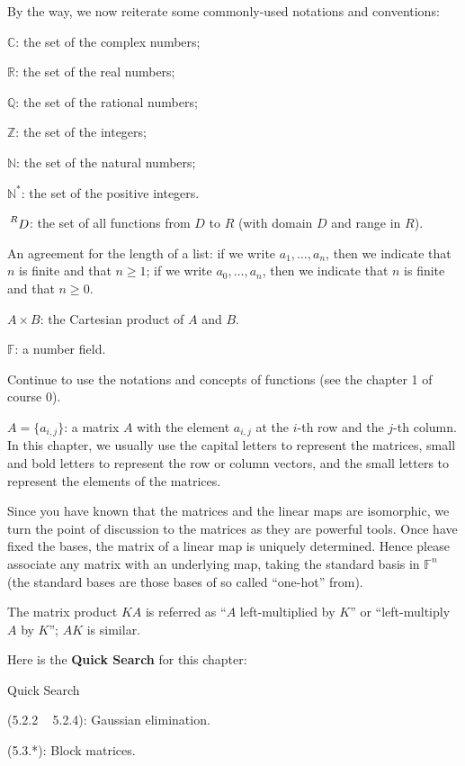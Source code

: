 \documentclass{article}
\begin{document}
By the way, we now reiterate some commonly-used notations and conventions:
\begin{compactenum}
    \item $\mathbb{C}$: the set of the complex numbers;
    \item $\mathbb{R}$: the set of the real numbers;
    \item $\mathbb{Q}$: the set of the rational numbers;
    \item $\mathbb{Z}$: the set of the integers;
    \item $\mathbb{N}$: the set of the natural numbers;
    \item $\mathbb{N^\ast}$: the set of the positive integers.
    \item $\sideset{^R}{}{\mathop{D}}$: the set of all functions from $D$ to $R$ (with domain $D$ and range in $R$).
    \item An agreement for the length of a list: if we write $a_1, \dots, a_n$, then we indicate that $n$ is finite and that $n\geq 1$; if we write $a_0, \dots, a_n$, then we indicate that $n$ is finite and that $n\geq 0$.
    \item $A\times B$: the Cartesian product of $A$ and $B$.
    \item $\mathbb{F}$: a number field.
    \item Continue to use the notations and concepts of functions (see the chapter 1 of course 0).
    \item $A = \{a_{i,j}\}$: a matrix $A$ with the element $a_{i,j}$ at the $i$-th row and the $j$-th column. In this chapter, we usually use the capital letters to represent the matrices, small and bold letters to represent the row or column vectors, and the small letters to represent the elements of the matrices.
    \item Since you have known that the matrices and the linear maps are isomorphic, we turn the point of discussion to the matrices as they are powerful tools. Once have fixed the bases, the matrix of a linear map is uniquely determined. Hence please associate any matrix with an underlying map, taking the standard basis in $\mathbb{F}^n$ (the standard bases are those bases of so called ``one-hot'' from).
    \item The matrix product $KA$ is referred as ``$A$ left-multiplied by $K$'' or ``left-multiply $A$ by $K$''; $AK$ is similar.
\end{compactenum} 

Here is the \textbf{Quick Search} for this chapter:
\begin{Th}{Quick Search}
    \begin{compactdesc}
        \item (5.2.2 ~ 5.2.4): Gaussian elimination.
        \item (5.3.*): Block matrices.
    \end{compactdesc}
\end{Th}
\end{document}
